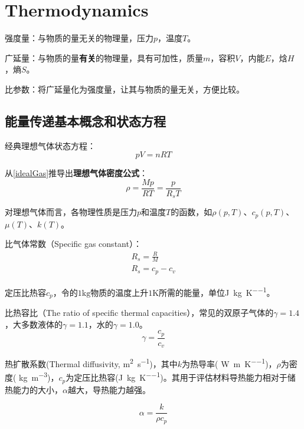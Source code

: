 \chapter{Thermodynamics}
强度量：与物质的量无关的物理量，压力$ p $，温度$ T $。

广延量：与物质的量\textbf{有关}的物理量，具有可加性，质量$ m $，容积$ V $，内能$ E $，焓$ H $，熵$ S $。

比参数：将广延量化为强度量，让其与物质的量无关，方便比较。

\section{能量传递基本概念和状态方程}

经典理想气体状态方程：
\begin{equation}
\label{idealGas}
pV=nRT
\end{equation}

从\autoref{idealGas}推导出\textbf{理想气体密度公式}：
\begin{equation}
\rho = \frac{Mp}{RT} = \frac{p}{R_s T}
\end{equation}

对理想气体而言，各物理性质是压力$ p $和温度$ T $的函数，如$ \rho(p,T) $、$ c_p(p,T) $、$ \mu(T) $、$ k(T) $。

比气体常数（Specific gas constant）：
\begin{gather}
R_s = \frac{R}{M} \\
R_s = c_p - c_v
\end{gather}

定压比热容$ c_p $，令的$ 1\si{\kilogram} $物质的温度上升$ 1\si{\kelvin} $所需的能量，单位\si{\joule\per\kilogram\per\kelvin}。

比热容比（The ratio of specific thermal capacities），常见的双原子气体的$ \gamma=1.4 $，大多数液体的$ \gamma=1.1 $，水的$ \gamma=1.0 $。
\begin{equation}
\gamma = \frac{c_p}{c_v}
\end{equation}

热扩散系数(Thermal diffusivity, \si{\meter\squared\per\second})，其中$ k $为热导率( \si{\watt\per\meter\per\kelvin})，$ \rho $为密度( \si{\kilogram\per\cubic\meter})，$ c_p $为定压比热容(\si{\joule\per\kilogram\per\kelvin})。其用于评估材料导热能力相对于储热能力的大小，$ \alpha $越大，导热能力越强。

\begin{equation}
\alpha = \frac{k}{\rho c_p}
\end{equation}

